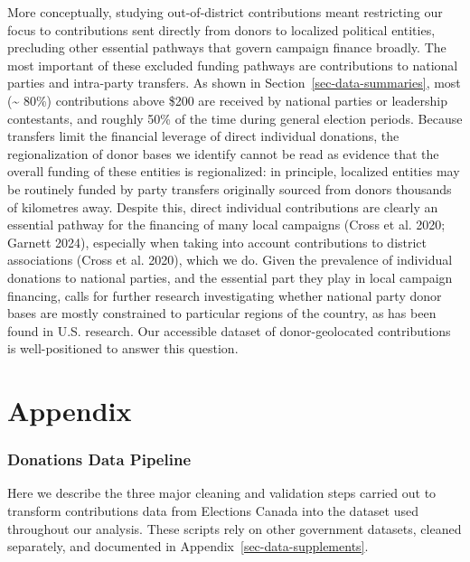 \documentclass[
  letterpaper,
  DIV=11,
  numbers=noendperiod]{scrartcl}
\begin{document}
More conceptually, studying out-of-district contributions meant
restricting our focus to contributions sent directly from donors to
localized political entities, precluding other essential pathways that
govern campaign finance broadly. The most important of these excluded
funding pathways are contributions to national parties and intra-party
transfers. As shown in Section~\ref{sec-data-summaries}, most
(\textasciitilde{} 80\%) contributions above \$200 are received by
national parties or leadership contestants, and roughly 50\% of the time
during general election periods. Because transfers limit the financial
leverage of direct individual donations, the regionalization of donor
bases we identify cannot be read as evidence that the overall funding of
these entities is regionalized: in principle, localized entities may be
routinely funded by party transfers originally sourced from donors
thousands of kilometres away. Despite this, direct individual
contributions are clearly an essential pathway for the financing of many
local campaigns (Cross et al. 2020; Garnett 2024), especially when
taking into account contributions to district associations (Cross et al.
2020), which we do. Given the prevalence of individual donations to
national parties, and the essential part they play in local campaign
financing, calls for further research investigating whether national
party donor bases are mostly constrained to particular regions of the
country, as has been found in U.S. research. Our accessible dataset of
donor-geolocated contributions is well-positioned to answer this
question.

\newpage
\part*{Appendix}
\appendix

\renewcommand{\thefigure}{\thesection\arabic{figure}}
\renewcommand{\thetable}{\thesection\arabic{table}}

\section{Donations Data Pipeline}\label{sec-pipeline}

Here we describe the three major cleaning and validation steps carried
out to transform contributions data from Elections Canada into the
dataset used throughout our analysis. These scripts rely on other
government datasets, cleaned separately, and documented in
Appendix~\ref{sec-data-supplements}.
\end{document}
